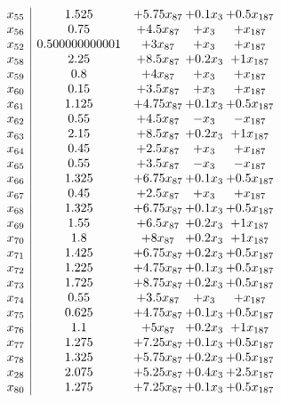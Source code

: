 \documentclass[11pt]{article}
\begin{document}
\[\begin{array}{c| c c@{\hskip 2pt} c@{\hskip 2pt} c@{\hskip 2pt} }
 x_{55}   &  1.525 & + 5.75 x_{87} & + 0.1 x_{3} & + 0.5 x_{187}\\
 x_{56}   &  0.75 & + 4.5 x_{87} & +  x_{3} & +  x_{187}\\
 x_{52}   &  0.500000000001 & + 3 x_{87} & +  x_{3} & +  x_{187}\\
 x_{58}   &  2.25 & + 8.5 x_{87} & + 0.2 x_{3} & + 1 x_{187}\\
 x_{59}   &  0.8 & + 4 x_{87} & +  x_{3} & +  x_{187}\\
 x_{60}   &  0.15 & + 3.5 x_{87} & +  x_{3} & +  x_{187}\\
 x_{61}   &  1.125 & + 4.75 x_{87} & + 0.1 x_{3} & + 0.5 x_{187}\\
 x_{62}   &  0.55 & + 4.5 x_{87} & - x_{3} & - x_{187}\\
 x_{63}   &  2.15 & + 8.5 x_{87} & + 0.2 x_{3} & + 1 x_{187}\\
 x_{64}   &  0.45 & + 2.5 x_{87} & +  x_{3} & +  x_{187}\\
 x_{65}   &  0.55 & + 3.5 x_{87} & - x_{3} & - x_{187}\\
 x_{66}   &  1.325 & + 6.75 x_{87} & + 0.1 x_{3} & + 0.5 x_{187}\\
 x_{67}   &  0.45 & + 2.5 x_{87} & +  x_{3} & +  x_{187}\\
 x_{68}   &  1.325 & + 6.75 x_{87} & + 0.1 x_{3} & + 0.5 x_{187}\\
 x_{69}   &  1.55 & + 6.5 x_{87} & + 0.2 x_{3} & + 1 x_{187}\\
 x_{70}   &  1.8 & + 8 x_{87} & + 0.2 x_{3} & + 1 x_{187}\\
 x_{71}   &  1.425 & + 6.75 x_{87} & + 0.2 x_{3} & + 0.5 x_{187}\\
 x_{72}   &  1.225 & + 4.75 x_{87} & + 0.1 x_{3} & + 0.5 x_{187}\\
 x_{73}   &  1.725 & + 8.75 x_{87} & + 0.2 x_{3} & + 0.5 x_{187}\\
 x_{74}   &  0.55 & + 3.5 x_{87} & +  x_{3} & +  x_{187}\\
 x_{75}   &  0.625 & + 4.75 x_{87} & + 0.1 x_{3} & + 0.5 x_{187}\\
 x_{76}   &  1.1 & + 5 x_{87} & + 0.2 x_{3} & + 1 x_{187}\\
 x_{77}   &  1.275 & + 7.25 x_{87} & + 0.1 x_{3} & + 0.5 x_{187}\\
 x_{78}   &  1.325 & + 5.75 x_{87} & + 0.2 x_{3} & + 0.5 x_{187}\\
 x_{28}   &  2.075 & + 5.25 x_{87} & + 0.4 x_{3} & + 2.5 x_{187}\\
 x_{80}   &  1.275 & + 7.25 x_{87} & + 0.1 x_{3} & + 0.5 x_{187}\\

\end{array}\]
\end{document}
